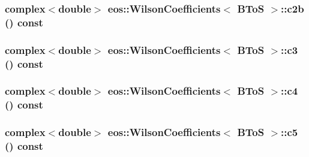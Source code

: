 \label{structeos_1_1WilsonCoefficients_3_01BToS_01_4_afcb665ee21ae1be28cec84c0a3781132}
\hypertarget{structeos_1_1WilsonCoefficients_3_01BToS_01_4_a8bfd88e1ee202d67cf6ad3e22fd0e311}{
\subsubsection[{c2b}]{\setlength{\rightskip}{0pt plus 5cm}complex$<$double$>$ eos::WilsonCoefficients$<$ {\bf BToS} $>$::c2b () const}}
\label{structeos_1_1WilsonCoefficients_3_01BToS_01_4_a8bfd88e1ee202d67cf6ad3e22fd0e311}
\hypertarget{structeos_1_1WilsonCoefficients_3_01BToS_01_4_a5f36442158531e3f364f0f3cf2cadfe2}{
\subsubsection[{c3}]{\setlength{\rightskip}{0pt plus 5cm}complex$<$double$>$ eos::WilsonCoefficients$<$ {\bf BToS} $>$::c3 () const}}
\label{structeos_1_1WilsonCoefficients_3_01BToS_01_4_a5f36442158531e3f364f0f3cf2cadfe2}
\hypertarget{structeos_1_1WilsonCoefficients_3_01BToS_01_4_a427b2d73d89283266b163cfe4c42b086}{
\subsubsection[{c4}]{\setlength{\rightskip}{0pt plus 5cm}complex$<$double$>$ eos::WilsonCoefficients$<$ {\bf BToS} $>$::c4 () const}}
\label{structeos_1_1WilsonCoefficients_3_01BToS_01_4_a427b2d73d89283266b163cfe4c42b086}
\hypertarget{structeos_1_1WilsonCoefficients_3_01BToS_01_4_ad68ee72fdb415820d0ff3f042a8d9e14}{
\subsubsection[{c5}]{\setlength{\rightskip}{0pt plus 5cm}complex$<$double$>$ eos::WilsonCoefficients$<$ {\bf BToS} $>$::c5 () const}}

